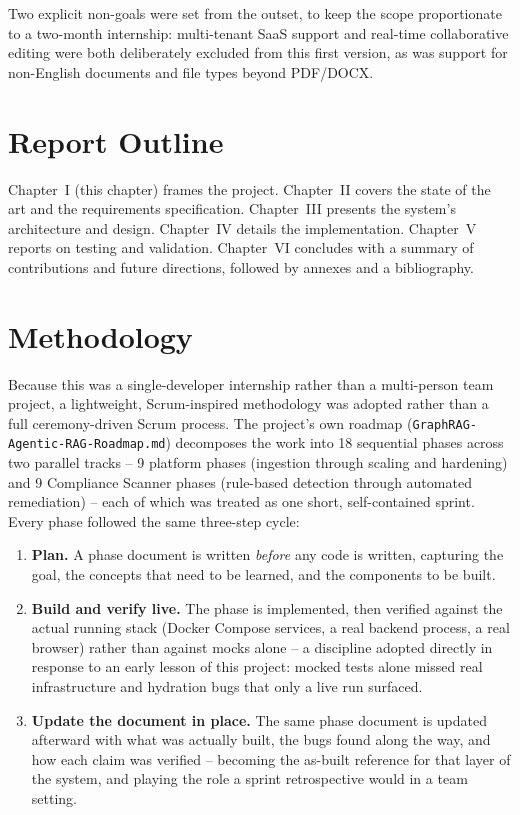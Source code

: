 \documentclass[12pt,a4paper]{report}
\begin{document}
Two explicit non-goals were set from the outset, to keep the scope
proportionate to a two-month internship: multi-tenant \ac{SaaS} support and
real-time collaborative editing were both deliberately excluded from this
first version, as was support for non-English documents and file types
beyond \ac{PDF}/DOCX.

\section{Report Outline}

Chapter~I (this chapter) frames the project. Chapter~II covers the state of
the art and the requirements specification. Chapter~III presents the
system's architecture and design. Chapter~IV details the implementation.
Chapter~V reports on testing and validation. Chapter~VI concludes with a
summary of contributions and future directions, followed by annexes and a
bibliography.

\section{Methodology}

Because this was a single-developer internship rather than a multi-person
team project, a lightweight, Scrum-inspired methodology was adopted rather
than a full ceremony-driven Scrum process. The project's own roadmap
(\texttt{GraphRAG-Agentic-RAG-Roadmap.md}) decomposes the work into 18
sequential phases across two parallel tracks -- 9 platform phases (ingestion
through scaling and hardening) and 9 Compliance Scanner phases (rule-based
detection through automated remediation) -- each of which was treated as one
short, self-contained sprint. Every phase followed the same three-step
cycle:

\begin{enumerate}
  \item \textbf{Plan.} A phase document is written \emph{before} any code
        is written, capturing the goal, the concepts that need to be
        learned, and the components to be built.
  \item \textbf{Build and verify live.} The phase is implemented, then
        verified against the actual running stack (Docker Compose services,
        a real backend process, a real browser) rather than against mocks
        alone -- a discipline adopted directly in response to an early
        lesson of this project: mocked tests alone missed real
        infrastructure and hydration bugs that only a live run surfaced.
  \item \textbf{Update the document in place.} The same phase document is
        updated afterward with what was actually built, the bugs found
        along the way, and how each claim was verified -- becoming the
        as-built reference for that layer of the system, and playing the
        role a sprint retrospective would in a team setting.
\end{enumerate}
\end{document}
